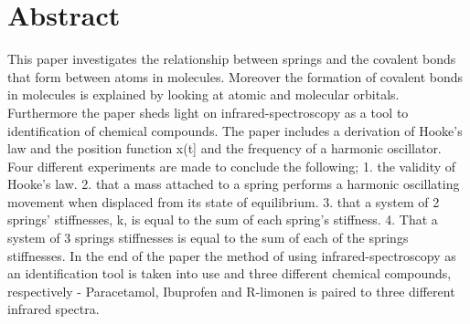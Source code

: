 \section*{Abstract}
This paper investigates the relationship between springs and the covalent bonds that form between atoms in molecules. Moreover the formation of covalent bonds in molecules is explained by looking at atomic and molecular orbitals. Furthermore the paper sheds light on infrared-spectroscopy as a tool to identification of chemical compounds. The paper includes a derivation of Hooke's law and the position function x(t] and the frequency of a harmonic oscillator. Four different experiments are made to conclude the following; 1. the validity of Hooke's law. 2. that a  mass attached to a spring performs a harmonic oscillating movement when displaced from its state of equilibrium. 3. that a system of 2 springs' stiffnesses, k, is equal to the sum of each spring's stiffness. 4. That a system of 3 springs stiffnesses is equal to the sum of each of the springs stiffnesses. 
In the end of the paper the method of using infrared-spectroscopy as an identification tool is taken into use and three different chemical compounds, respectively - Paracetamol, Ibuprofen and R-limonen is paired to three different infrared spectra. 
